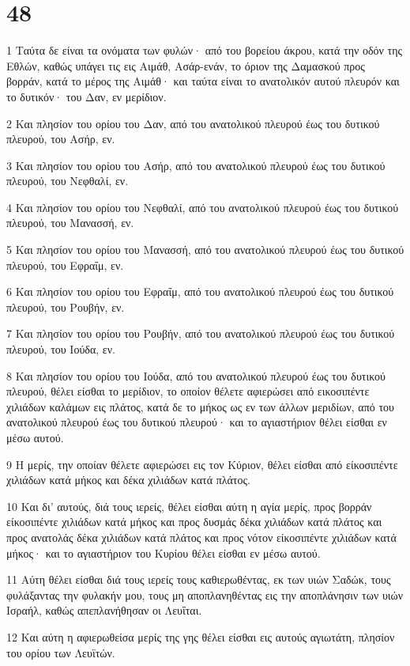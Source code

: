 \chapter{48}

\par 1 Ταύτα δε είναι τα ονόματα των φυλών· από του βορείου άκρου, κατά την οδόν της Εθλών, καθώς υπάγει τις εις Αιμάθ, Ασάρ-ενάν, το όριον της Δαμασκού προς βορράν, κατά το μέρος της Αιμάθ· και ταύτα είναι το ανατολικόν αυτού πλευρόν και το δυτικόν· του Δαν, εν μερίδιον.
\par 2 Και πλησίον του ορίου του Δαν, από του ανατολικού πλευρού έως του δυτικού πλευρού, του Ασήρ, εν.
\par 3 Και πλησίον του ορίου του Ασήρ, από του ανατολικού πλευρού έως του δυτικού πλευρού, του Νεφθαλί, εν.
\par 4 Και πλησίον του ορίου του Νεφθαλί, από του ανατολικού πλευρού έως του δυτικού πλευρού, του Μανασσή, εν.
\par 5 Και πλησίον του ορίου του Μανασσή, από του ανατολικού πλευρού έως του δυτικού πλευρού, του Εφραΐμ, εν.
\par 6 Και πλησίον του ορίου του Εφραΐμ, από του ανατολικού πλευρού έως του δυτικού πλευρού, του Ρουβήν, εν.
\par 7 Και πλησίον του ορίου του Ρουβήν, από του ανατολικού πλευρού έως του δυτικού πλευρού, του Ιούδα, εν.
\par 8 Και πλησίον του ορίου του Ιούδα, από του ανατολικού πλευρού έως του δυτικού πλευρού, θέλει είσθαι το μερίδιον, το οποίον θέλετε αφιερώσει από εικοσιπέντε χιλιάδων καλάμων εις πλάτος, κατά δε το μήκος ως εν των άλλων μεριδίων, από του ανατολικού πλευρού έως του δυτικού πλευρού· και το αγιαστήριον θέλει είσθαι εν μέσω αυτού.
\par 9 Η μερίς, την οποίαν θέλετε αφιερώσει εις τον Κύριον, θέλει είσθαι από είκοσιπέντε χιλιάδων κατά μήκος και δέκα χιλιάδων κατά πλάτος.
\par 10 Και δι' αυτούς, διά τους ιερείς, θέλει είσθαι αύτη η αγία μερίς, προς βορράν είκοσιπέντε χιλιάδων κατά μήκος και προς δυσμάς δέκα χιλιάδων κατά πλάτος και προς ανατολάς δέκα χιλιάδων κατά πλάτος και προς νότον είκοσιπέντε χιλιάδων κατά μήκος· και το αγιαστήριον του Κυρίου θέλει είσθαι εν μέσω αυτού.
\par 11 Αύτη θέλει είσθαι διά τους ιερείς τους καθιερωθέντας, εκ των υιών Σαδώκ, τους φυλάξαντας την φυλακήν μου, τους μη αποπλανηθέντας εις την αποπλάνησιν των υιών Ισραήλ, καθώς απεπλανήθησαν οι Λευΐται.
\par 12 Και αύτη η αφιερωθείσα μερίς της γης θέλει είσθαι εις αυτούς αγιωτάτη, πλησίον του ορίου των Λευϊτών.
